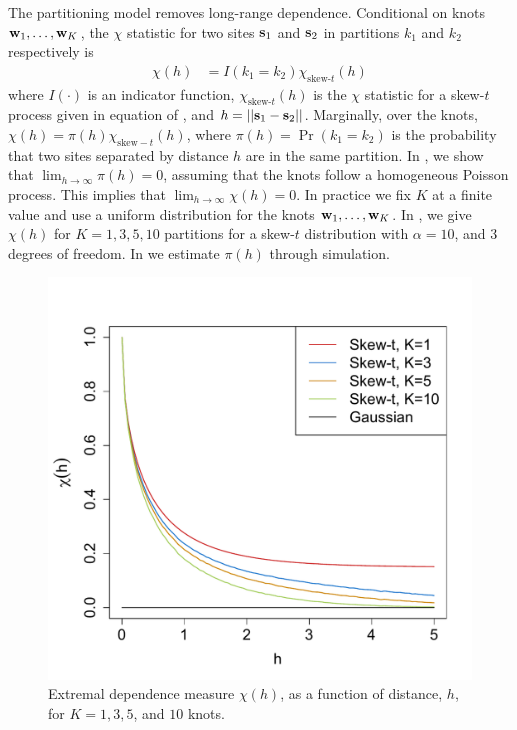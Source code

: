 \documentclass[useAMS,usenatbib,referee]{biom}
\begin{document}
The partitioning model removes long-range dependence. Conditional on knots $\mbox{\bf w}_1, \ldots, \mbox{\bf w}_K$, the $\chi$ statistic for two sites $\mbox{\bf s}_1$ and $\mbox{\bf s}_2$ in partitions $k_1$ and $k_2$ respectively is
\begin{align}
  \chi(h) &= I(k_1 = k_2) \chi_{\text{skew-}t}(h) \label{steq:chiskewt}
\end{align}
where $I(\cdot)$ is an indicator function, $\chi_{\text{skew-}t}(h)$ is the $\chi$ statistic for a skew-$t$ process given in equation  of , and $h = ||\mbox{\bf s}_1 - \mbox{\bf s}_2||$.
Marginally, over the knots, $\chi(h) = \pi(h) \chi_{\text{skew}-t}(h)$, where $\pi(h) = \Pr(k_1 = k_2)$ is the probability that two sites separated by distance $h$ are in the same partition.
In , we show that $\lim_{h \rightarrow \infty} \pi(h) = 0$, assuming that the knots follow a homogeneous Poisson process.
This implies that $\lim_{h \rightarrow \infty} \chi(h) = 0$.
In practice we fix $K$ at a finite value and use a uniform distribution for the knots $\mbox{\bf w}_1, \ldots, \mbox{\bf w}_K$.
In , we give $\chi(h)$ for $K = 1, 3, 5, 10$ partitions for a skew-$t$ distribution with $\alpha = 10$, and 3 degrees of freedom.
In  we estimate $\pi(h)$ through simulation.

\begin{figure}
  \centering
  \includegraphics[width=0.5\linewidth]{plots/chi-h.pdf}
  \caption{Extremal dependence measure $\chi(h)$, as a function of distance, $h$, for $K = 1, 3, 5$, and $10$ knots.}
  \label{stfig:chi}
\end{figure}
\end{document}
